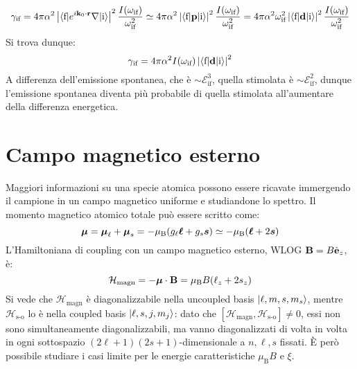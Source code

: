 \begin{equation*}
	\gamma_\text{if} = 4\pi \alpha^2 \left\lvert\braket{\text{f} | e^{i \mathbf{k}_0 \cdot \mathbf{r}} \nabla | \text{i}}\right\rvert^2 \frac{I(\omega_\text{if})}{\omega_\text{if}^2} \simeq 4\pi \alpha^2 \left\lvert\braket{\text{f} | \mathbf{p} | \text{i}}\right\rvert^2 \frac{I(\omega_\text{if})}{\omega_\text{if}^2} = 4\pi \alpha^2 \omega_\text{if}^2 \left\lvert\braket{\text{f} | \mathbf{d} | \text{i}}\right\rvert^2 \frac{I(\omega_\text{if})}{\omega_\text{if}^2}
\end{equation*}
Si trova dunque:
\begin{equation}
	\gamma_\text{if} = 4\pi \alpha^2 I(\omega_\text{if}) \left\lvert\braket{\text{f} | \mathbf{d} | \text{i}}\right\rvert^2
	\label{eq:stimul-trans-prob}
\end{equation}
A differenza dell'emissione spontanea, che è $ \sim \mathcal{E}_\text{if}^3 $, quella stimolata è $ \sim \mathcal{E}_\text{if}^2 $, dunque l'emissione spontanea diventa più probabile di quella stimolata all'aumentare della differenza energetica.

\section{Campo magnetico esterno}

Maggiori informazioni su una specie atomica possono essere ricavate immergendo il campione in un campo magnetico uniforme e studiandone lo spettro. Il momento magnetico atomico totale può essere scritto come:
\begin{equation}
	\boldsymbol{\mu} = \boldsymbol{\mu}_\ell + \boldsymbol{\mu}_s = - \mu_\text{B} ( g_\ell \boldsymbol{\ell} + g_s \boldsymbol{s}) \simeq - \mu_\text{B} (\boldsymbol{\ell} + 2 \boldsymbol{s})
\end{equation}
L'Hamiltoniana di coupling con un campo magnetico esterno, WLOG $ \mathbf{B} = B \hat{\mathbf{e}}_z $, è:
\begin{equation}
	\mathcal{H}_\text{magn} = - \boldsymbol{\mu} \cdot \mathbf{B} = \mu_\text{B} B (\ell_z + 2s_z)
\end{equation}
Si vede che $ \mathcal{H}_\text{magn} $ è diagonalizzabile nella uncoupled basis $ \ket{\ell, m, s, m_s} $, mentre $ \mathcal{H}_\text{s-o} $ lo è nella coupled basis $ \ket{\ell, s, j, m_j} $: dato che $ [\mathcal{H}_\text{magn} , \mathcal{H}_\text{s-o}] \neq 0 $, essi non sono simultaneamente diagonalizzabili, ma vanno diagonalizzati di volta in volta in ogni sottospazio $ (2\ell + 1)(2s + 1) $-dimensionale a $ n,\ell,s $ fissati.
È però possibile studiare i casi limite per le energie caratteristiche $ \mu_\text{B} B $ e $ \xi $.

